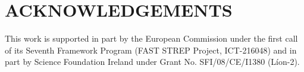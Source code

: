 \documentclass[a4paper,twoside]{article}
\begin{document}
\onecolumn \maketitle \normalsize \vfill













\section*{ACKNOWLEDGEMENTS} This work is supported in part by the European Commission under the first call of its Seventh Framework Program (FAST STREP Project, ICT-216048) and in part by Science Foundation Ireland under Grant No. SFI/08/CE/I1380 (L\'ion-2).

\renewcommand{\baselinestretch}{0.98}

{\small
}
\renewcommand{\baselinestretch}{1}
\end{document}
